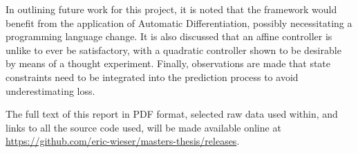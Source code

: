 \documentclass[main.tex]{subfiles}
\begin{document}
In outlining future work for this project, it is noted that the {\Pilco} framework would benefit from the application of Automatic Differentiation, possibly necessitating a programming language change.
It is also discussed that an affine controller is unlike to ever be satisfactory, with a quadratic controller shown to be desirable by means of a thought experiment.
Finally, observations are made that state constraints need to be integrated into the prediction process to avoid underestimating loss.

The full text of this report in PDF format, selected raw data used within, and links to all the source code used, will be made available online at \url{https://github.com/eric-wieser/masters-thesis/releases}.
\end{document}
